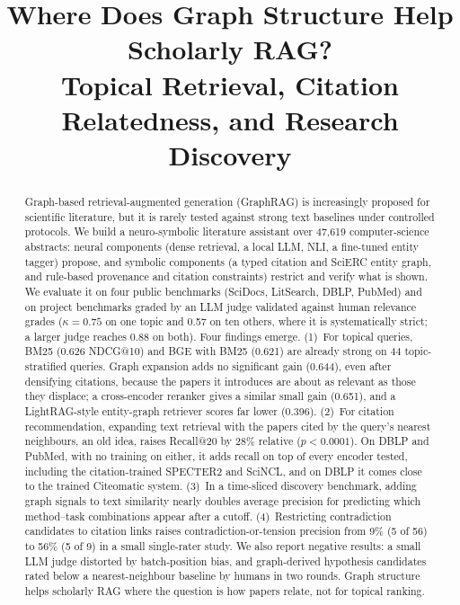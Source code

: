 \documentclass[conference]{IEEEtran}
\begin{document}
\title{Where Does Graph Structure Help Scholarly RAG?\\
Topical Retrieval, Citation Relatedness, and Research Discovery}

\author{
}

\maketitle

\begin{abstract}
Graph-based retrieval-augmented generation (GraphRAG) is increasingly proposed for scientific literature, but it is rarely tested against strong text baselines under controlled protocols. We build a neuro-symbolic literature assistant over 47,619 computer-science abstracts: neural components (dense retrieval, a local LLM, NLI, a fine-tuned entity tagger) propose, and symbolic components (a typed citation and SciERC entity graph, and rule-based provenance and citation constraints) restrict and verify what is shown. We evaluate it on four public benchmarks (SciDocs, LitSearch, DBLP, PubMed) and on project benchmarks graded by an LLM judge validated against human relevance grades ($\kappa = 0.75$ on one topic and 0.57 on ten others, where it is systematically strict; a larger judge reaches 0.88 on both). Four findings emerge. (1)~For topical queries, BM25 (0.626 NDCG@10) and BGE with BM25 (0.621) are already strong on 44 topic-stratified queries. Graph expansion adds no significant gain (0.644), even after densifying citations, because the papers it introduces are about as relevant as those they displace; a cross-encoder reranker gives a similar small gain (0.651), and a LightRAG-style entity-graph retriever scores far lower (0.396). (2)~For citation recommendation, expanding text retrieval with the papers cited by the query's nearest neighbours, an old idea, raises Recall@20 by 28\% relative ($p < 0.0001$). On DBLP and PubMed, with no training on either, it adds recall on top of every encoder tested, including the citation-trained SPECTER2 and SciNCL, and on DBLP it comes close to the trained Citeomatic system. (3)~In a time-sliced discovery benchmark, adding graph signals to text similarity nearly doubles average precision for predicting which method--task combinations appear after a cutoff. (4)~Restricting contradiction candidates to citation links raises contradiction-or-tension precision from 9\% (5 of 56) to 56\% (5 of 9) in a small single-rater study. We also report negative results: a small LLM judge distorted by batch-position bias, and graph-derived hypothesis candidates rated below a nearest-neighbour baseline by humans in two rounds. Graph structure helps scholarly RAG where the question is how papers relate, not for topical ranking.
\end{abstract}
\end{document}

